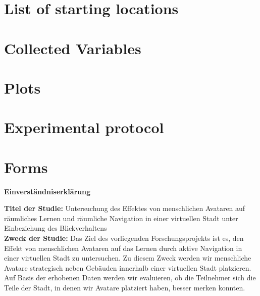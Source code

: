 \chapter{List of starting locations}\label{appx:starting_locations}


\chapter{Collected Variables}\label{appx:variables}%


\chapter{Plots}\label{appx:plots}


\chapter{Experimental protocol}\label{appx:protocol}


\chapter{Forms}\label{appx:forms}

\begin{center}
	\LARGE{\textbf{Einverständniserklärung}} \\
\end{center}


\textbf{Titel der Studie:} Untersuchung des Effektes von menschlichen Avataren auf räumliches Lernen und räumliche Navigation in einer virtuellen Stadt unter Einbeziehung des Blickverhaltens \\

\textbf{Zweck der Studie:} Das Ziel des vorliegenden Forschungsprojekts ist es, den Effekt von menschlichen Avataren auf das Lernen durch aktive Navigation in einer virtuellen Stadt zu untersuchen. Zu diesem Zweck werden wir menschliche Avatare strategisch neben Gebäuden innerhalb einer virtuellen Stadt platzieren. Auf Basis der erhobenen Daten werden wir evaluieren, ob die Teilnehmer sich die Teile der Stadt, in denen wir Avatare platziert haben, besser merken konnten. \\

